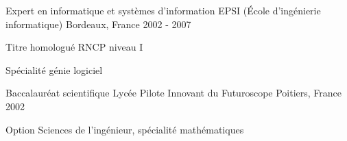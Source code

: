 

\begin{cventries}

  \cventry
    {Expert en informatique et systèmes d’information} %
    {EPSI (École d’ingénierie informatique)} %
    {Bordeaux, France} %
    {2002 - 2007} %
    {
      \begin{cvitems} %
        \item {Titre homologué RNCP niveau I}
        \item {Spécialité génie logiciel}
      \end{cvitems}
    }

  \cventry
    {Baccalauréat scientifique} %
    {Lycée Pilote Innovant du Futuroscope} %
    {Poitiers, France} %
    {2002} %
    {
      \begin{cvitems} %
        \item {Option Sciences de l'ingénieur, spécialité mathématiques}
      \end{cvitems}
    }

\end{cventries}
